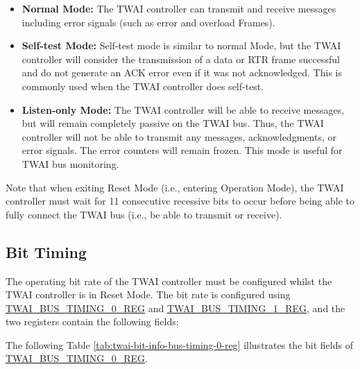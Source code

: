 \documentclass[main\_\_EN.tex]{subfiles}
\begin{document}
\begin{itemize}
    \item {\bfseries Normal Mode:} The TWAI controller can transmit and receive messages including error signals (such as error and overload Frames).
    \item {\bfseries Self-test Mode:} Self-test mode is similar to normal Mode, but the TWAI controller will consider the transmission of a data or RTR frame successful and do not generate an ACK error even if it was not acknowledged. This is commonly used when the TWAI controller does self-test.
    \item {\bfseries Listen-only Mode:} The TWAI controller will be able to receive messages, but will remain completely passive on the TWAI bus. Thus, the TWAI controller will not be able to transmit any messages, acknowledgments, or error signals. The error counters will remain frozen. This mode is useful for TWAI bus monitoring.
\end{itemize}

Note that when exiting Reset Mode (i.e., entering Operation Mode), the TWAI controller must wait for 11 consecutive recessive bits to occur before being able to fully connect the TWAI bus (i.e., be able to transmit or receive).

\subsection{Bit Timing}
The operating bit rate of the TWAI controller must be configured whilst the TWAI controller is in Reset Mode. The bit rate is configured using \hyperref[regdesc:TWAIBUSTIMING0REG]{TWAI\_BUS\_TIMING\_0\_REG} and \hyperref[regdesc:TWAIBUSTIMING1REG]{TWAI\_BUS\_TIMING\_1\_REG}, and the two registers contain the following fields:

The following Table \ref{tab:twai-bit-info-bus-timing-0-reg} illustrates the bit fields of \hyperref[regdesc:TWAIBUSTIMING0REG]{TWAI\_BUS\_TIMING\_0\_REG}.
\end{document}
